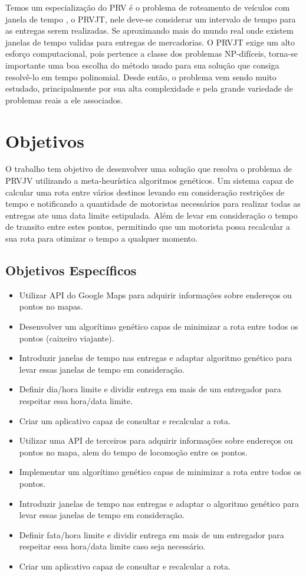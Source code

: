 Temos um especialização do PRV é o problema de roteamento de veículos com janela de tempo , o PRVJT, nele deve-se considerar um intervalo de tempo para as entregas serem realizadas. Se aproximando mais do mundo real onde existem janelas de tempo validas para entregas de mercadorias.
O PRVJT exige um alto esforço computacional, pois pertence a classe dos problemas NP-difíceis, torna-se importante uma boa escolha do método usado para sua solução que consiga resolvê-lo em tempo polinomial.
Desde então, o problema vem sendo muito estudado, principalmente por sua alta complexidade e pela grande variedade de problemas reais a ele associados.

\section{Objetivos}

O trabalho tem objetivo de desenvolver uma solução que resolva o problema de PRVJV utilizando a meta-heurística algoritmos genéticos. Um sistema capaz de calcular uma rota entre vários destinos 
levando em consideração restrições de tempo e notificando a quantidade de motoristas necessários para realizar todas as entregas ate uma data limite estipulada. Além de levar  
em consideração o tempo de transito entre estes pontos, permitindo que um motorista possa recalcular a sua rota para otimizar o tempo a qualquer momento.

\subsection{Objetivos Específicos}

\begin{itemize}
	\item Utilizar API do Google Maps para adquirir informações sobre endereços ou pontos no mapas.
	\item Desenvolver um algorítimo genético capas de minimizar a rota entre todos os pontos (caixeiro viajante).
	\item Introduzir janelas de tempo nas entregas e adaptar algoritmo genético para levar essas janelas de tempo em consideração.
	\item Definir dia/hora limite e dividir entrega em mais de um entregador para respeitar essa hora/data limite.
	\item Criar um aplicativo capaz de consultar e recalcular a rota.
	\item Utilizar uma API de terceiros para adquirir informações sobre endereços ou pontos no mapa, alem do tempo de locomoção entre os pontos.
	\item Implementar um algorítimo genético capas de minimizar a rota entre todos os pontos.
	\item Introduzir janelas de tempo nas entregas e adaptar o algoritmo genético para levar essas janelas de tempo em consideração.
	\item Definir fata/hora limite e dividir entrega em mais de um entregador para respeitar essa hora/data limite caso seja necessário.
	\item Criar um aplicativo capaz de consultar e recalcular a rota.
\end{itemize}

